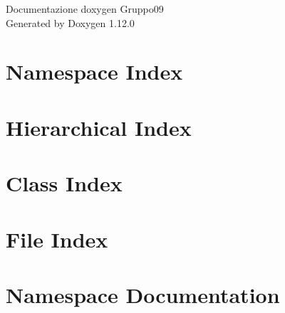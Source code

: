 \documentclass[twoside]{book}
\newcommand{\+}{\discretionary{\mbox{\scriptsize$\hookleftarrow$}}{}{}}
\newcommand{\clearemptydoublepage}{%
    \newpage{\pagestyle{empty}\cleardoublepage}%
  }
\begin{document}
  \raggedbottom
    \hypersetup{pageanchor=false,
                bookmarksnumbered=true,
                pdfencoding=unicode
               }
  \begin{titlepage}
  \vspace*{7cm}
  \begin{center}%
  {\Large Documentazione doxygen Gruppo09}\\
  \vspace*{1cm}
  {\large Generated by Doxygen 1.12.0}\\
  \end{center}
  \end{titlepage}
  \clearemptydoublepage
  \tableofcontents
  \clearemptydoublepage
  \hypersetup{pageanchor=true}
\chapter{Namespace Index}

\chapter{Hierarchical Index}

\chapter{Class Index}

\chapter{File Index}

\chapter{Namespace Documentation}




\end{document}
